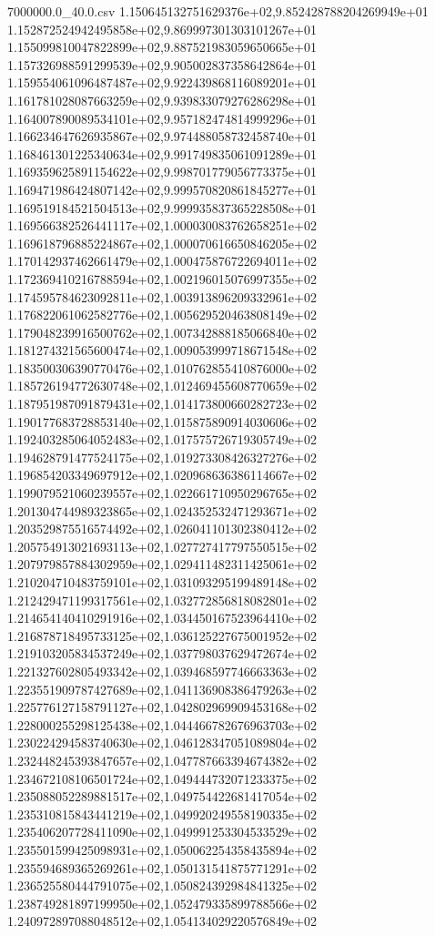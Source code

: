 \begin{filecontents*}{7000000.0_40.0.csv}
1.150645132751629376e+02,9.852428788204269949e+01
1.152872524942495858e+02,9.869997301303101267e+01
1.155099810047822899e+02,9.887521983059650665e+01
1.157326988591299539e+02,9.905002837358642864e+01
1.159554061096487487e+02,9.922439868116089201e+01
1.161781028087663259e+02,9.939833079276286298e+01
1.164007890089534101e+02,9.957182474814999296e+01
1.166234647626935867e+02,9.974488058732458740e+01
1.168461301225340634e+02,9.991749835061091289e+01
1.169359625891154622e+02,9.998701779056773375e+01
1.169471986424807142e+02,9.999570820861845277e+01
1.169519184521504513e+02,9.999935837365228508e+01
1.169566382526441117e+02,1.000030083762658251e+02
1.169618796885224867e+02,1.000070616650846205e+02
1.170142937462661479e+02,1.000475876722694011e+02
1.172369410216788594e+02,1.002196015076997355e+02
1.174595784623092811e+02,1.003913896209332961e+02
1.176822061062582776e+02,1.005629520463808149e+02
1.179048239916500762e+02,1.007342888185066840e+02
1.181274321565600474e+02,1.009053999718671548e+02
1.183500306390770476e+02,1.010762855410876000e+02
1.185726194772630748e+02,1.012469455608770659e+02
1.187951987091879431e+02,1.014173800660282723e+02
1.190177683728853140e+02,1.015875890914030606e+02
1.192403285064052483e+02,1.017575726719305749e+02
1.194628791477524175e+02,1.019273308426327276e+02
1.196854203349697912e+02,1.020968636386114667e+02
1.199079521060239557e+02,1.022661710950296765e+02
1.201304744989323865e+02,1.024352532471293671e+02
1.203529875516574492e+02,1.026041101302380412e+02
1.205754913021693113e+02,1.027727417797550515e+02
1.207979857884302959e+02,1.029411482311425061e+02
1.210204710483759101e+02,1.031093295199489148e+02
1.212429471199317561e+02,1.032772856818082801e+02
1.214654140410291916e+02,1.034450167523964410e+02
1.216878718495733125e+02,1.036125227675001952e+02
1.219103205834537249e+02,1.037798037629472674e+02
1.221327602805493342e+02,1.039468597746663363e+02
1.223551909787427689e+02,1.041136908386479263e+02
1.225776127158791127e+02,1.042802969909453168e+02
1.228000255298125438e+02,1.044466782676963703e+02
1.230224294583740630e+02,1.046128347051089804e+02
1.232448245393847657e+02,1.047787663394674382e+02
1.234672108106501724e+02,1.049444732071233375e+02
1.235088052289881517e+02,1.049754422681417054e+02
1.235310815843441219e+02,1.049920249558190335e+02
1.235406207728411090e+02,1.049991253304533529e+02
1.235501599425098931e+02,1.050062254358435894e+02
1.235594689365269261e+02,1.050131541875771291e+02
1.236525580444791075e+02,1.050824392984841325e+02
1.238749281897199950e+02,1.052479335899788566e+02
1.240972897088048512e+02,1.054134029220576849e+02

\end{filecontents*}
